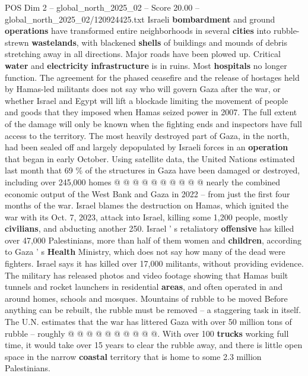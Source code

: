 \begin{textsample}{POS Dim 2 – global\_north\_2025\_02 – Score 20.00 – global\_north\_2025\_02/120924425.txt}  \label{ex:f2_pos_438}
Israeli \textbf{bombardment} and ground \textbf{operations} have transformed entire neighborhoods in several \textbf{cities} into rubble-strewn \textbf{wastelands}, with blackened \textbf{shells} of buildings and mounds of debris stretching away in all directions.
Major roads have been plowed up.
Critical \textbf{water} and \textbf{electricity} \textbf{infrastructure} is in ruins.
Most \textbf{hospitals} no longer function.
The agreement for the phased ceasefire and the release of hostages held by Hamas-led militants does not say who will govern Gaza after the war, or whether Israel and Egypt will lift a blockade limiting the movement of people and goods that they imposed when Hamas seized power in 2007.
The full extent of the damage will only be known when the fighting ends and inspectors have full access to the territory.
The most heavily destroyed part of Gaza, in the north, had been sealed off and largely depopulated by Israeli forces in an \textbf{operation} that began in early October.
Using satellite data, the United Nations estimated last month that 69 \% of the structures in Gaza have been damaged or destroyed, including over 245,000 homes @ @ @ @ @ @ @ @ @ @ nearly the combined economic output of the West Bank and Gaza in 2022 -- from just the first four months of the war.
Israel blames the destruction on Hamas, which ignited the war with its Oct. 7, 2023, attack into Israel, killing some 1,200 people, mostly \textbf{civilians}, and abducting another 250.
Israel ' s retaliatory \textbf{offensive} has killed over 47,000 Palestinians, more than half of them women and \textbf{children}, according to Gaza ' s \textbf{Health} Ministry, which does not say how many of the dead were fighters.
Israel says it has killed over 17,000 militants, without providing evidence.
The military has released photos and video footage showing that Hamas built tunnels and rocket launchers in residential \textbf{areas}, and often operated in and around homes, schools and mosques.
Mountains of rubble to be moved Before anything can be rebuilt, the rubble must be removed -- a staggering task in itself.
The U.N. estimates that the war has littered Gaza with over 50 million tons of rubble -- roughly @ @ @ @ @ @ @ @ @ @.
With over 100 \textbf{trucks} working full time, it would take over 15 years to clear the rubble away, and there is little open space in the narrow \textbf{coastal} territory that is home to some 2.3 million Palestinians.

\end{textsample}
